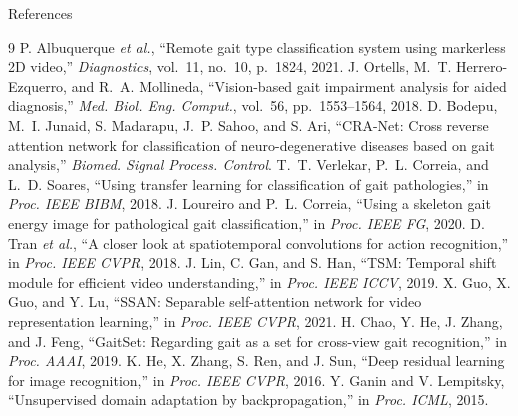 \documentclass[aspectratio=169,10pt]{beamer}
\begin{document}
\begin{frame}{References}
\tiny
\begin{thebibliography}{9}
 P. Albuquerque \textit{et al.}, ``Remote gait type classification
system using markerless 2D video,'' \emph{Diagnostics}, vol.~11, no.~10,
p.~1824, 2021.
 J. Ortells, M.~T. Herrero-Ezquerro, and R.~A. Mollineda,
``Vision-based gait impairment analysis for aided diagnosis,'' \emph{Med. Biol.
Eng. Comput.}, vol.~56, pp.~1553--1564, 2018.
 D. Bodepu, M.~I. Junaid, S. Madarapu, J.~P. Sahoo, and S. Ari,
``CRA-Net: Cross reverse attention network for classification of
neuro-degenerative diseases based on gait analysis,'' \emph{Biomed. Signal
Process. Control}.
 T.~T. Verlekar, P.~L. Correia, and L.~D. Soares, ``Using transfer
learning for classification of gait pathologies,'' in \emph{Proc. IEEE BIBM},
2018.
 J. Loureiro and P.~L. Correia, ``Using a skeleton gait energy image
for pathological gait classification,'' in \emph{Proc. IEEE FG}, 2020.
 D. Tran \textit{et al.}, ``A closer look at spatiotemporal
convolutions for action recognition,'' in \emph{Proc. IEEE CVPR}, 2018.
 J. Lin, C. Gan, and S. Han, ``TSM: Temporal shift module for
efficient video understanding,'' in \emph{Proc. IEEE ICCV}, 2019.
 X. Guo, X. Guo, and Y. Lu, ``SSAN: Separable self-attention network
for video representation learning,'' in \emph{Proc. IEEE CVPR}, 2021.
 H. Chao, Y. He, J. Zhang, and J. Feng, ``GaitSet: Regarding gait as
a set for cross-view gait recognition,'' in \emph{Proc. AAAI}, 2019.
 K. He, X. Zhang, S. Ren, and J. Sun, ``Deep residual learning for
image recognition,'' in \emph{Proc. IEEE CVPR}, 2016.
 Y. Ganin and V. Lempitsky, ``Unsupervised domain adaptation by
backpropagation,'' in \emph{Proc. ICML}, 2015.
\end{thebibliography}
\end{frame}
\end{document}
